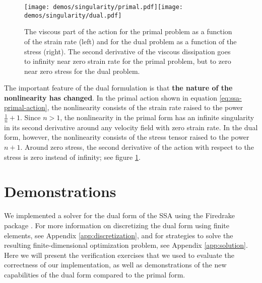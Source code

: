 \documentclass{article}
\theoremstyle{definition}
\theoremstyle{plain}
\begin{document}
\begin{figure}[h]
    \texttt{[image: demos/singularity/primal.pdf]}\texttt{[image: demos/singularity/dual.pdf]}
    \caption{The viscous part of the action for the primal problem as a function of the strain rate (left) and for the dual problem as a function of the stress (right).
    The second derivative of the viscous dissipation goes to infinity near zero strain rate for the primal problem, but to zero near zero stress for the dual problem.}
    \label{fig:primal-vs-dual}
\end{figure}

The important feature of the dual formulation is that \textbf{the nature of the nonlinearity has changed}.
In the primal action shown in equation \eqref{eq:ssa-primal-action}, the nonlinearity consists of the strain rate raised to the power $\frac{1}{n} + 1$.
Since $n > 1$, the nonlinearity in the primal form has an infinite singularity in its second derivative around any velocity field with zero strain rate.
In the dual form, however, the nonlinearity consists of the stress tensor raised to the power $n + 1$.
Around zero stress, the second derivative of the action with respect to the stress is zero instead of infinity; see figure \ref{fig:primal-vs-dual}.



\section{Demonstrations}

We implemented a solver for the dual form of the SSA using the Firedrake package \citep{FiredrakeUserManual}.
For more information on discretizing the dual form using finite elements, see Appendix \ref{app:discretization}, and for strategies to solve the resulting finite-dimensional optimization problem, see Appendix \ref{app:solution}.
Here we will present the verification exercises that we used to evaluate the correctness of our implementation, as well as demonstrations of the new capabilities of the dual form compared to the primal form.
\end{document}
